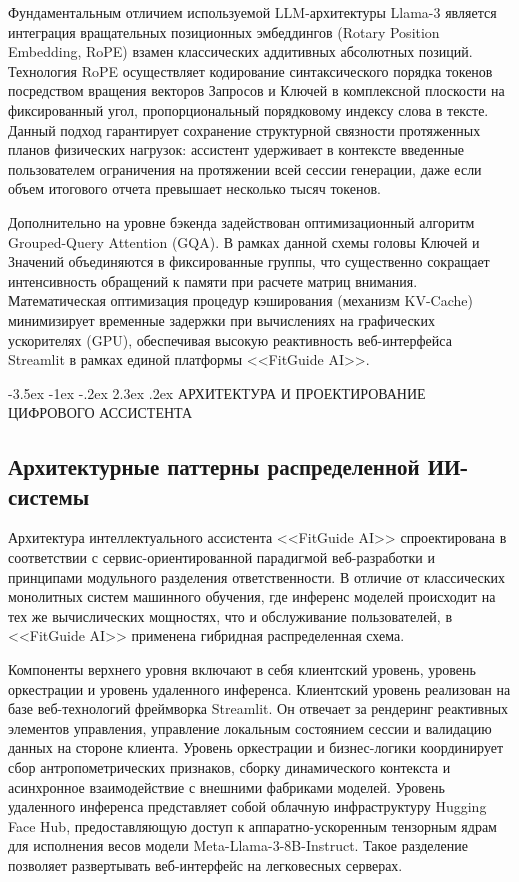 \documentclass[14pt, a4paper]{extarticle}
\makeatletter
\renewcommand\section{\@startsection {section}{1}{\z@}%
                                   {-3.5ex \@plus -1ex \@minus -.2ex}%
                                   {2.3ex \@plus.2ex}%
                                   {\centering\normalfont\Large\bfseries}}
\makeatother
\begin{document}
Фундаментальным отличием используемой LLM-архитектуры Llama-3 является интеграция вращательных позиционных эмбеддингов (Rotary Position Embedding, RoPE) взамен классических аддитивных абсолютных позиций. Технология RoPE осуществляет кодирование синтаксического порядка токенов посредством вращения векторов Запросов и Ключей в комплексной плоскости на фиксированный угол, пропорциональный порядковому индексу слова в тексте. Данный подход гарантирует сохранение структурной связности протяженных планов физических нагрузок: ассистент удерживает в контексте введенные пользователем ограничения на протяжении всей сессии генерации, даже если объем итогового отчета превышает несколько тысяч токенов.

Дополнительно на уровне бэкенда задействован оптимизационный алгоритм Grouped-Query Attention (GQA). В рамках данной схемы головы Ключей и Значений объединяются в фиксированные группы, что существенно сокращает интенсивность обращений к памяти при расчете матриц внимания. Математическая оптимизация процедур кэширования (механизм KV-Cache) минимизирует временные задержки при вычислениях на графических ускорителях (GPU), обеспечивая высокую реактивность веб-интерфейса Streamlit в рамках единой платформы <<FitGuide AI>>.




\newpage
\section{АРХИТЕКТУРА И ПРОЕКТИРОВАНИЕ ЦИФРОВОГО АССИСТЕНТА}

\subsection{Архитектурные паттерны распределенной ИИ-системы}

Архитектура интеллектуального ассистента <<FitGuide AI>> спроектирована в соответствии с сервис-ориентированной парадигмой веб-разработки и принципами модульного разделения ответственности. В отличие от классических монолитных систем машинного обучения, где инференс моделей происходит на тех же вычислических мощностях, что и обслуживание пользователей, в <<FitGuide AI>> применена гибридная распределенная схема.

Компоненты верхнего уровня включают в себя клиентский уровень, уровень оркестрации и уровень удаленного инференса. Клиентский уровень реализован на базе веб-технологий фреймворка Streamlit. Он отвечает за рендеринг реактивных элементов управления, управление локальным состоянием сессии и валидацию данных на стороне клиента. Уровень оркестрации и бизнес-логики координирует сбор антропометрических признаков, сборку динамического контекста и асинхронное взаимодействие с внешними фабриками моделей. Уровень удаленного инференса представляет собой облачную инфраструктуру Hugging Face Hub, предоставляющую доступ к аппаратно-ускоренным тензорным ядрам для исполнения весов модели Meta-Llama-3-8B-Instruct. Такое разделение позволяет развертывать веб-интерфейс на легковесных серверах.
\end{document}
